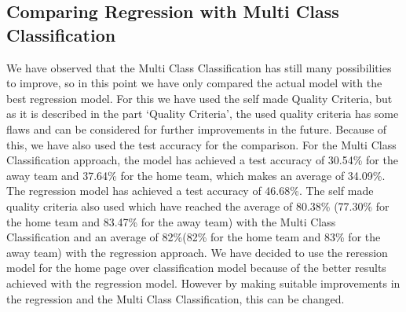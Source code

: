 \subsection{Comparing Regression with Multi Class Classification}
We have observed that the Multi Class Classification has still many possibilities to improve, so in this point we have only compared the actual model with the best regression model. For this we have used the self made Quality Criteria, but as it is described in the part `Quality Criteria', the used quality criteria has some flaws and can be considered for further improvements in the future. Because of this, we have also used the test accuracy for the comparison. For the Multi Class Classification approach, the model has achieved a test accuracy of 30.54\% for the away team and 37.64\% for the home team, which makes an average of 34.09\%. The regression model has achieved a test accuracy of 46.68\%. The self made quality criteria also used which have reached the average of  80.38\% (77.30\% for the home team and 83.47\% for the away team) with the Multi Class Classification and an average of 82\%(82\% for the home team and 83\% for the away team) with the regression approach. We have decided to use the reression model for the home page over classification model because of the better results achieved with the regression model. However by making suitable improvements in the regression and the Multi Class Classification, this can be changed.